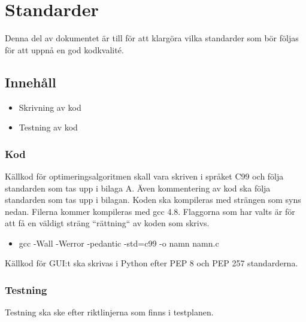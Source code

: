 \section{Standarder}
Denna del av dokumentet är till för att klargöra vilka standarder som bör följas för att uppnå en god kodkvalité.

\subsection{Innehåll}
\begin{itemize}
\item Skrivning av kod
\item Testning av kod
\end{itemize}

\subsubsection{Kod}
Källkod för optimeringsalgoritmen skall vara skriven i språket C99 och följa standarden som tas upp i bilaga A. Även kommentering av kod ska följa standarden som tas upp i bilagan. 
\newline
\newline
Koden ska kompileras med strängen som syns nedan. Filerna kommer kompileras med gcc 4.8. Flaggorna som har valts är för att få en väldigt sträng ``rättning`` av koden som skrivs. 

\begin{itemize}
\item gcc -Wall -Werror -pedantic -std=c99 -o namn namn.c
\end{itemize}
\newline
Källkod för GUI:t ska skrivas i Python efter PEP 8 och PEP 257 standarderna. 

\subsubsection{Testning}
Testning ska ske efter riktlinjerna som finns i testplanen.
